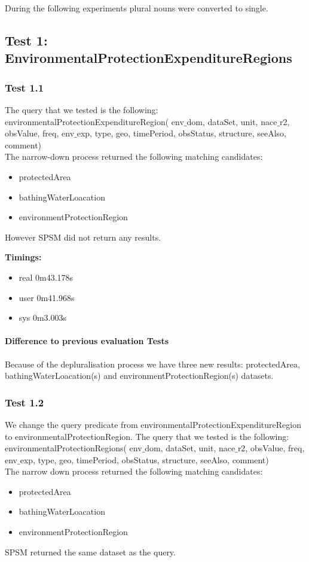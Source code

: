 \documentclass[a4paper,10pt]{article}
\begin{document}
During the following experiments plural nouns were converted to single.


\subsection{ Test 1: EnvironmentalProtectionExpenditureRegions}

\subsubsection{Test 1.1}
 The query that we tested is the following: \\
\indent  environmentalProtectionExpenditureRegion( env$\_$dom, dataSet, unit, nace$\_$r2,  obsValue, freq, env$\_$exp, type, geo, timePeriod, obsStatus, structure, seeAlso, comment)\\

The narrow-down process returned the following matching candidates:
\begin{itemize}
\item protectedArea
\item bathingWaterLoacation
\item environmentProtectionRegion
\end{itemize}

However SPSM did not return any results.

\textbf{Timings:}
\begin{itemize}
\item real	0m43.178s
\item user	0m41.968s
\item sys	0m3.003s

\end{itemize}


\paragraph{Difference to previous evaluation Tests}
Because of the depluralisation process we have three new results: protectedArea,  bathingWaterLoacation(s) and environmentProtectionRegion(s) datasets.
\subsubsection{Test 1.2}
We change the query predicate from environmentalProtectionExpenditureRegion to environmentalProtectionRegion. The query that we tested is the following:\\
\indent environmentalProtectionRegions( env$\_$dom, dataSet, unit, nace$\_$r2,  obsValue, freq, env$\_$exp, type, geo, timePeriod, obsStatus, structure, seeAlso, comment)\\
The narrow down process returned the following matching candidates:
\begin{itemize}
\item protectedArea
\item bathingWaterLoacation
\item environmentProtectionRegion
\end{itemize}
SPSM returned the same dataset as the query.
\end{document}
